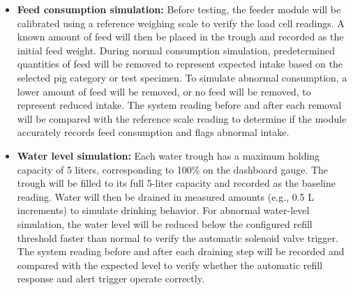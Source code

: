 \begin{itemize}
  \item \textbf{Feed consumption simulation:} Before testing, the feeder module will be calibrated using a reference weighing scale to verify the load cell readings. A known amount of feed will then be placed in the trough and recorded as the initial feed weight. During normal consumption simulation, predetermined quantities of feed will be removed to represent expected intake based on the selected pig category or test specimen. To simulate abnormal consumption, a lower amount of feed will be removed, or no feed will be removed, to represent reduced intake. The system reading before and after each removal will be compared with the reference scale reading to determine if the module accurately records feed consumption and flags abnormal intake.
  \item \textbf{Water level simulation:} Each water trough has a maximum holding capacity of 5 liters, corresponding to 100\% on the dashboard gauge. The trough will be filled to its full 5-liter capacity and recorded as the baseline reading. Water will then be drained in measured amounts (e.g., 0.5 L increments) to simulate drinking behavior. For abnormal water-level simulation, the water level will be reduced below the configured refill threshold faster than normal to verify the automatic solenoid valve trigger. The system reading before and after each draining step will be recorded and compared with the expected level to verify whether the automatic refill response and alert trigger operate correctly.


\end{itemize}

